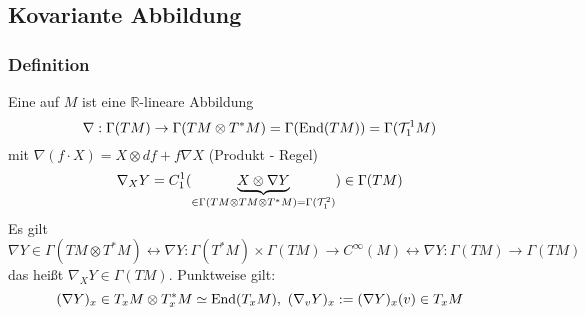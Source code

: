 
\subsection{Kovariante Abbildung}

\subsubsection{Definition}
\label{ssub:27}
Eine  auf $M$ ist eine $\mathds{R}$-lineare Abbildung
\[
\nabla:\Gamma(TM)\to\Gamma(TM\otimes T^* M) = \Gamma(\operatorname{End}(TM))=\Gamma(\mathcal{T}_1^1 M)
\]
mit $\nabla(f\cdot X) = X\otimes df + f\nabla X$ (Produkt - Regel)
\[
\nabla_X Y = C_1^1(\underbrace{X\otimes \nabla Y}_{\in \Gamma(TM\otimes TM\otimes T^* M) = \Gamma(\mathcal{T}_1^2)}) \in \Gamma (TM)
\]
Es gilt
\[
\nabla Y\in\Gamma(TM\otimes T^*M)\leftrightarrow\nabla Y:\Gamma(T^*M)\times\Gamma(TM)\to C^\infty(M)\leftrightarrow \nabla Y:\Gamma(TM)\to\Gamma(TM)
\]
das heißt $\nabla_XY\in\Gamma(TM)$. Punktweise gilt:
\[
(\nabla Y)_x\in T_x M\otimes T^*_x M \simeq \operatorname{End} (T_x M),\ (\nabla_v Y)_x := (\nabla Y)_x(v)\in T_x M
\]

